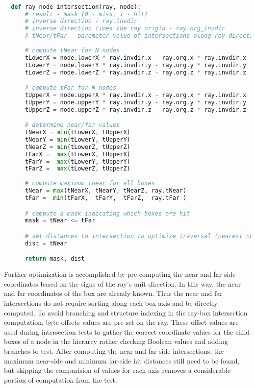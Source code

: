 \begin{lstlisting}[language=Python,basicstyle=\tiny,caption={A non-branching ray-node intersection test for a quad tree implementation.},
    label={alg:no-branch ray-box pseudo code},captionpos=b]

  def ray_node_intersection(ray, node):
      # result - mask (0 - miss, 1 - hit)
      # inverse direction - ray.invdir
      # inverse direction times the ray origin - ray.org_invdir
      # tNear/tFar - parameter value of intersections along ray direction
  
      # compute tNear for N nodes
      tLowerX = node.lowerX * ray.invdir.x - ray.org.x * ray.invdir.x
      tLowerY = node.lowerY * ray.invdir.y - ray.org.y * ray.invdir.y
      tLowerZ = node.lowerZ * ray.invdir.z - ray.org.z * ray.invdir.z

      # compute tFar for N nodes
      tUpperX = node.upperX * ray.invdir.x - ray.org.x * ray.invdir.x
      tUpperY = node.upperY * ray.invdir.y - ray.org.y * ray.invdir.y
      tUpperZ = node.upperZ * ray.invdir.z - ray.org.z * ray.invdir.z

      # determine near/far values
      tNearX = min(tLowerX, tUpperX)
      tNearY = min(tLowerY, tUpperY)
      tNearZ = min(tLowerZ, tUpperZ)
      tFarX =  max(tLowerX, tUpperX)
      tFarY =  max(tLowerY, tUpperY)
      tFarZ =  max(tLowerZ, tUpperZ)
      
      # compute maximum tnear for all boxes
      tNear = max(tNearX, tNearY, tNearZ, ray.tNear) 
      tFar =  min(tFarX,  tFarY,  tFarZ,  ray.tFar )

      # compute a mask indicating which boxes are hit
      mask = tNear <= tFar

      # set distances to intersection to optimize traversal (nearest nodes first)
      dist = tNear

      return mask, dist
\end{lstlisting}

Further optimization is accomplished by pre-computing the near and far side
coordinates based on the signs of the ray's unit direction. In this way, the
near and far coordinates of the box are already known. Thus the near and far
intersections do not require sorting along each box axis and be directly
computed. To avoid branching and structure indexing in the ray-box intersection
computation, byte offsets values are pre-set on the ray. These offset values are
used during intersection tests to gather the correct coordinate values for the
child boxes of a node in the hierarcy rather checking Boolean values and adding
branches to test. After computing the near and far side intersections, the
maximum near-side and minimum far-side hit distances still need to be found, but
skipping the comparision of values for each axis removes a considerable portion
of computation from the test.

